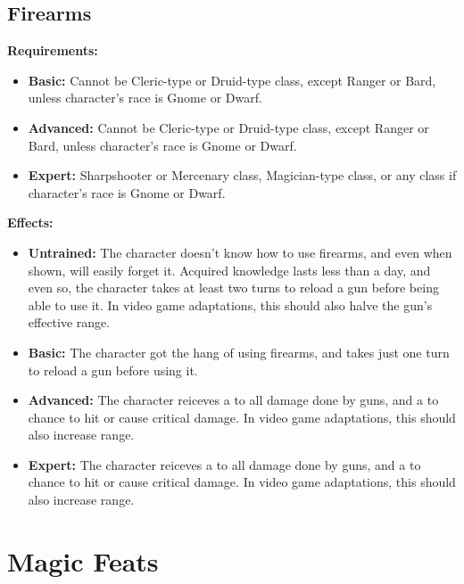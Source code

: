 \documentclass[openany,10pt,a4paper]{book}
\begin{document}
\subsection{Firearms}
\begin{table}[!ht]
\centering
{}
\end{table}
\textbf{Requirements:}
\begin{itemize}
	\item \textbf{Basic:} Cannot be Cleric-type or Druid-type class, except Ranger or Bard, unless character's race is Gnome or Dwarf.
	\item \textbf{Advanced:} Cannot be Cleric-type or Druid-type class, except Ranger or Bard, unless character's race is Gnome or Dwarf.
	\item \textbf{Expert:} Sharpshooter or Mercenary class, Magician-type class, or any class if character's race is Gnome or Dwarf.
\end{itemize}
\textbf{Effects:}
\begin{itemize}
	\item \textbf{Untrained:} The character doesn't know how to use firearms, and even when shown, will easily forget it. Acquired knowledge lasts less than a day, and even so, the character takes at least two turns to reload a gun before being able to use it. In video game adaptations, this should also halve the gun's effective range.
	\item \textbf{Basic:} The character got the hang of using firearms, and takes just one turn to reload a gun before using it. 
	\item \textbf{Advanced:} The character reiceves a  to all damage done by guns, and a  to chance to hit or cause critical damage. In video game adaptations, this should also increase range.
	\item \textbf{Expert:} The character reiceves a  to all damage done by guns, and a  to chance to hit or cause critical damage. In video game adaptations, this should also increase range.
\end{itemize}\newpage
\section{Magic Feats}
\end{document}
